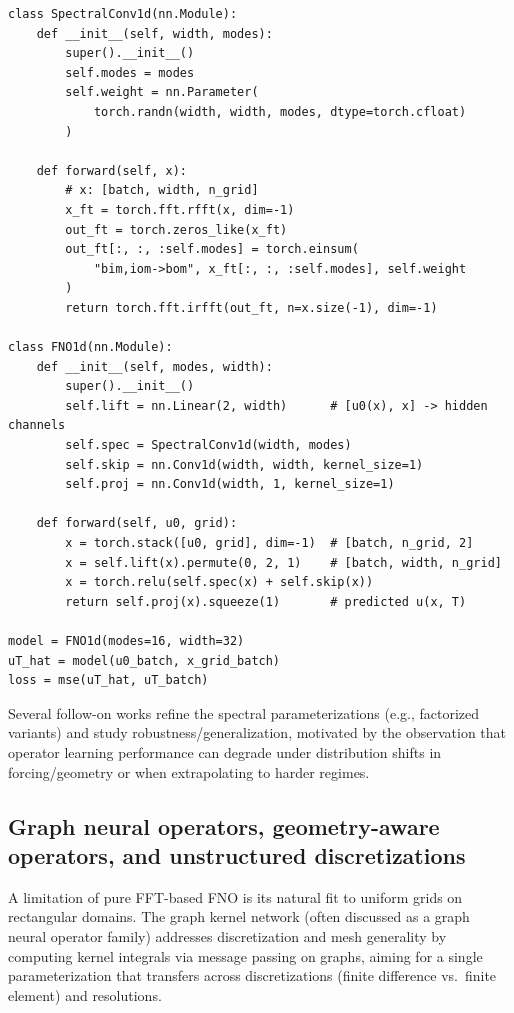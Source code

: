 \documentclass[11pt]{article}
\begin{document}
\begin{lstlisting}[style=scimlpython,caption={Representative 1D Fourier neural operator sketch for a Burgers-type mapping.},label={lst:fno}]
class SpectralConv1d(nn.Module):
    def __init__(self, width, modes):
        super().__init__()
        self.modes = modes
        self.weight = nn.Parameter(
            torch.randn(width, width, modes, dtype=torch.cfloat)
        )

    def forward(self, x):
        # x: [batch, width, n_grid]
        x_ft = torch.fft.rfft(x, dim=-1)
        out_ft = torch.zeros_like(x_ft)
        out_ft[:, :, :self.modes] = torch.einsum(
            "bim,iom->bom", x_ft[:, :, :self.modes], self.weight
        )
        return torch.fft.irfft(out_ft, n=x.size(-1), dim=-1)

class FNO1d(nn.Module):
    def __init__(self, modes, width):
        super().__init__()
        self.lift = nn.Linear(2, width)      # [u0(x), x] -> hidden channels
        self.spec = SpectralConv1d(width, modes)
        self.skip = nn.Conv1d(width, width, kernel_size=1)
        self.proj = nn.Conv1d(width, 1, kernel_size=1)

    def forward(self, u0, grid):
        x = torch.stack([u0, grid], dim=-1)  # [batch, n_grid, 2]
        x = self.lift(x).permute(0, 2, 1)    # [batch, width, n_grid]
        x = torch.relu(self.spec(x) + self.skip(x))
        return self.proj(x).squeeze(1)       # predicted u(x, T)

model = FNO1d(modes=16, width=32)
uT_hat = model(u0_batch, x_grid_batch)
loss = mse(uT_hat, uT_batch)
\end{lstlisting}

Several follow-on works refine the spectral parameterizations (e.g., factorized variants) and study robustness/generalization, motivated by the observation that operator learning performance can degrade under distribution shifts in forcing/geometry or when extrapolating to harder regimes.

\subsection{Graph neural operators, geometry-aware operators, and unstructured discretizations}

A limitation of pure FFT-based FNO is its natural fit to uniform grids on rectangular domains. The graph kernel network (often discussed as a graph neural operator family) addresses discretization and mesh generality by computing kernel integrals via message passing on graphs, aiming for a single parameterization that transfers across discretizations (finite difference vs.\ finite element) and resolutions.
\end{document}
